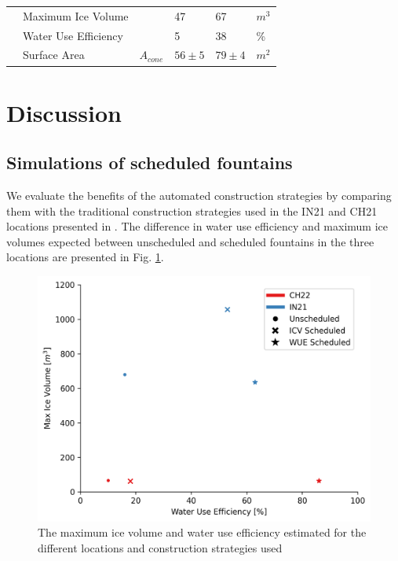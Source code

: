 \documentclass[tc, manuscript]{copernicus}
\begin{document}
\begin{table}
\begin{tabular}{@{}|llllll|@{}}
		                       & Maximum Ice Volume              &                 & 47            & 67            & $m^{3}$ \\
		\multicolumn{1}{|l|}{} & Water Use Efficiency            &                 & 5             & 38            & \% \\
		\multicolumn{1}{|l|}{} & Surface Area                    &  $A_{cone}$     & $56\pm 5$  & $79 \pm 4$     &$m^{2}$ \\\midrule
	\end{tabular}
\end{table}

\section{Discussion}

\subsection{Simulations of scheduled fountains}

We evaluate the benefits of the automated construction strategies by comparing them with the traditional construction strategies used in the IN21 and CH21 locations presented in
\cite{balasubramanianInfluenceMeteorologicalConditions2022}. The difference in water use efficiency and maximum ice volumes expected between unscheduled and scheduled fountains in the three locations are presented in Fig.
\ref{fig:wue}.

\begin{figure}[t]
\includegraphics[width=12cm]{Figures/wue.png}
\caption{The maximum ice volume and water use efficiency estimated for the different locations and construction
strategies used}
\label{fig:wue}
\end{figure}
\end{document}
